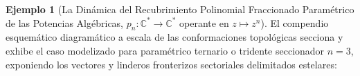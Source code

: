 \documentclass[11pt,a4paper]{article}
\theoremstyle{definition}
\newtheorem{ejemplo}{Ejemplo}[section]
\theoremstyle{remark}
\numberwithin{equation}{section}
\begin{document}
\begin{ejemplo}[La Dinámica del Recubrimiento Polinomial Fraccionado Paramétrico de las Potencias Algébricas, $p_n: \mathbb{C}^* \to \mathbb{C}^*$ operante en $z \mapsto z^n$]
El compendio esquemático diagramático a escala de las conformaciones topológicas secciona y exhibe el caso modelizado para paramétrico ternario o tridente seccionador $n=3$, exponiendo los vectores y linderos fronterizos sectoriales delimitados estelares:
\begin{center}
\end{center}
\end{ejemplo}
\end{document}
